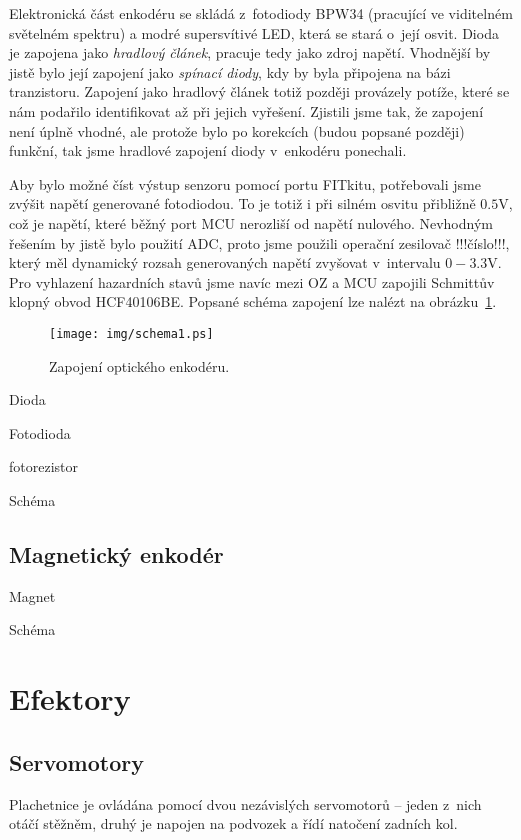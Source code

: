 Elektronická část enkodéru se skládá z~fotodiody BPW34 (pracující ve viditelném světelném spektru) a modré supersvítivé LED, která se stará o~její osvit. Dioda je zapojena jako \emph{hradlový článek}, pracuje tedy jako zdroj napětí. Vhodnější by jistě bylo její zapojení jako \emph{spínací diody}, kdy by byla připojena na bázi tranzistoru. Zapojení jako hradlový článek totiž později provázely potíže, které se nám podařilo identifikovat až při jejich vyřešení. Zjistili jsme tak, že zapojení není úplně vhodné, ale protože bylo po korekcích (budou popsané později) funkční, tak jsme hradlové zapojení diody v~enkodéru ponechali.

Aby bylo možné číst výstup senzoru pomocí portu FITkitu, potřebovali jsme zvýšit napětí generované fotodiodou. To je totiž i při silném osvitu přibližně $0.5$V, což je napětí, které běžný port MCU nerozliší od napětí nulového. Nevhodným řešením by jistě bylo použití ADC, proto jsme použili operační zesilovač !!!číslo!!!, který měl dynamický rozsah generovaných napětí zvyšovat v~intervalu $0-3.3$V. Pro vyhlazení hazardních stavů jsme navíc mezi OZ a MCU zapojili Schmittův klopný obvod HCF40106BE. Popsané schéma zapojení lze nalézt na obrázku~\ref{fig:schema1}.

\begin{figure}[h]
\centering 
\texttt{[image: img/schema1.ps]}
\caption{Zapojení optického enkodéru.}
\label{fig:schema1}
\end{figure}

Dioda

Fotodioda

fotorezistor

Schéma

\subsection{Magnetický enkodér}

Magnet

Schéma
\section{Efektory}

\subsection{Servomotory}
Plachetnice je ovládána pomocí dvou nezávislých servomotorů -- jeden z~nich
otáčí stěžněm, druhý je napojen na podvozek a řídí natočení zadních kol.

